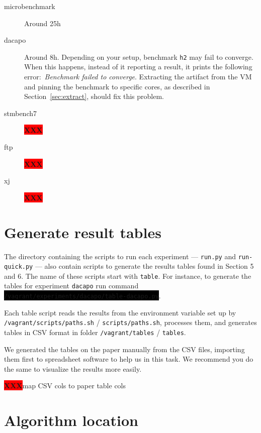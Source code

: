 \documentclass[12pt]{article}
\newcommand{\command}[1]{\colorbox{black}{\texttt{\color{white}#1}}}
\newcommand{\host}[1]{\colorbox{blue!20}{\texttt{\color{black}#1}}}
\newcommand{\vm}[1]{\colorbox{green!20}{\texttt{\color{black}#1}}}
\newcommand{\XXX}{\colorbox{red}{\bf\color{white}XXX}}
\begin{document}
\begin{description}

    \item[microbenchmark] Around 25h

    \item[dacapo] Around 8h.  Depending on your setup, benchmark \texttt{h2} may
        fail to converge.  When this happens, instead of it reporting a result,
        it prints the following error:~\emph{Benchmark failed to converge}.
        Extracting the artifact from the VM and pinning the benchmark to
        specific cores, as described in Section~\ref{sec:extract}, should fix
        this problem.

    \item[stmbench7] \XXX

    \item[ftp] \XXX

    \item[xj] \XXX

\end{description}

\section{Generate result tables}
\label{sec:tables}

The directory containing the scripts to run each experiment --- \texttt{run.py}
and \texttt{run-quick.py} --- also contain scripts to generate the results
tables found in Section 5 and 6.  The name of these scripts start with
\texttt{table}.  For instance, to generate the tables for experiment
\texttt{dacapo} run command\linebreak
\command{/vagrant/experiments/dacapo/table-dacapo.py}.

Each table script reads the results from the environment variable set up by
\vm{/vagrant/scripts/paths.sh} / \host{scripts/paths.sh}, processes them, and
generates tables in CSV format in folder \vm{/vagrant/tables} / \host{tables}.

We generated the tables on the paper manually from the CSV files, importing them
first to spreadsheet software to help us in this task.  We recommend you do the
same to visualize the results more easily.

\XXX map CSV cols to paper table cols

\section{Algorithm location}
\label{sec:algorithm}
\end{document}
